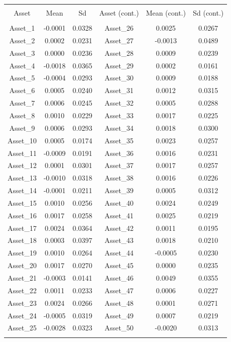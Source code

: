 \documentclass[11pt,preprint, authoryear]{elsarticle}
\let\origtable\table
\let\endorigtable\endtable
\renewenvironment{table}[1][2] {
    \expandafter\origtable\expandafter[H]
} {
    \endorigtable
}
\numberwithin{equation}{section}
\numberwithin{figure}{section}
\numberwithin{table}{section}
\begin{document}
\begin{table}[!htbp] \centering 
  \caption{Calibrated Means and Standard Deviations of Simulated Assets} 
  \label{msd} 
\begin{tabular}{@{\extracolsep{5pt}} cccccc} 
\\[-1.8ex]\hline 
\hline \\[-1.8ex] 
Asset & Mean & Sd & Asset (cont.) & Mean (cont.) & Sd (cont.) \\ 
\hline \\[-1.8ex] 
Asset\_1 & -0.0001 & 0.0328 & Asset\_26 &  0.0025 & 0.0267 \\ 
Asset\_2 &  0.0002 & 0.0231 & Asset\_27 & -0.0013 & 0.0489 \\ 
Asset\_3 &  0.0000 & 0.0236 & Asset\_28 &  0.0009 & 0.0239 \\ 
Asset\_4 & -0.0018 & 0.0365 & Asset\_29 &  0.0002 & 0.0161 \\ 
Asset\_5 & -0.0004 & 0.0293 & Asset\_30 &  0.0009 & 0.0188 \\ 
Asset\_6 &  0.0005 & 0.0240 & Asset\_31 &  0.0012 & 0.0315 \\ 
Asset\_7 &  0.0006 & 0.0245 & Asset\_32 &  0.0005 & 0.0288 \\ 
Asset\_8 &  0.0010 & 0.0229 & Asset\_33 &  0.0017 & 0.0225 \\ 
Asset\_9 &  0.0006 & 0.0293 & Asset\_34 &  0.0018 & 0.0300 \\ 
Asset\_10 &  0.0005 & 0.0174 & Asset\_35 &  0.0023 & 0.0257 \\ 
Asset\_11 & -0.0009 & 0.0191 & Asset\_36 &  0.0016 & 0.0231 \\ 
Asset\_12 &  0.0001 & 0.0301 & Asset\_37 &  0.0017 & 0.0257 \\ 
Asset\_13 & -0.0010 & 0.0318 & Asset\_38 &  0.0016 & 0.0226 \\ 
Asset\_14 & -0.0001 & 0.0211 & Asset\_39 &  0.0005 & 0.0312 \\ 
Asset\_15 &  0.0010 & 0.0256 & Asset\_40 &  0.0024 & 0.0249 \\ 
Asset\_16 &  0.0017 & 0.0258 & Asset\_41 &  0.0025 & 0.0219 \\ 
Asset\_17 &  0.0024 & 0.0364 & Asset\_42 &  0.0011 & 0.0195 \\ 
Asset\_18 &  0.0003 & 0.0397 & Asset\_43 &  0.0018 & 0.0210 \\ 
Asset\_19 &  0.0010 & 0.0264 & Asset\_44 & -0.0005 & 0.0230 \\ 
Asset\_20 &  0.0017 & 0.0270 & Asset\_45 &  0.0000 & 0.0235 \\ 
Asset\_21 & -0.0003 & 0.0141 & Asset\_46 &  0.0049 & 0.0355 \\ 
Asset\_22 &  0.0011 & 0.0233 & Asset\_47 &  0.0006 & 0.0227 \\ 
Asset\_23 &  0.0024 & 0.0266 & Asset\_48 &  0.0001 & 0.0271 \\ 
Asset\_24 & -0.0005 & 0.0319 & Asset\_49 &  0.0007 & 0.0219 \\ 
Asset\_25 & -0.0028 & 0.0323 & Asset\_50 & -0.0020 & 0.0313 \\ 
\hline \\[-1.8ex] 
\end{tabular} 
\end{table}


\end{document}
